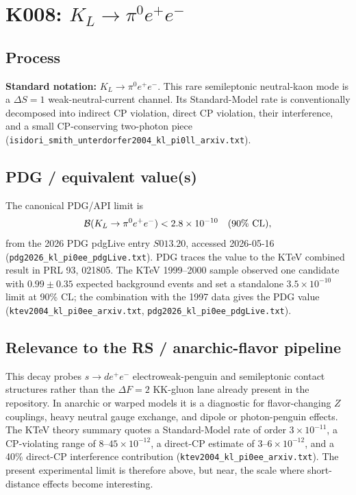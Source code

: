 
\section{\texorpdfstring{K008: \(K_L \to \pi^0 e^+e^-\)}{K008: KL -> pi0 e+e-}}

\subsection*{Process}
\textbf{Standard notation:} \(K_L \to \pi^0 e^+e^-\).  This rare
semileptonic neutral-kaon mode is a \(\Delta S=1\) weak-neutral-current
channel.  Its Standard-Model rate is conventionally decomposed into indirect
CP violation, direct CP violation, their interference, and a small
CP-conserving two-photon piece
(\texttt{isidori\_smith\_unterdorfer2004\_kl\_pi0ll\_arxiv.txt}).

\subsection*{PDG / equivalent value(s)}
The canonical PDG/API limit is
\[
  {\cal B}(K_L \to \pi^0 e^+e^-) < 2.8\times 10^{-10}\quad(90\%\ {\rm CL}),
\]
from the 2026 PDG pdgLive entry \(S013.20\), accessed 2026-05-16
(\texttt{pdg2026\_kl\_pi0ee\_pdgLive.txt}).  PDG traces the value to the KTeV
combined result in PRL 93, 021805.  The KTeV 1999--2000 sample observed one
candidate with \(0.99\pm0.35\) expected background events and set a standalone
\(3.5\times10^{-10}\) limit at 90\% CL; the combination with the 1997 data
gives the PDG value
(\texttt{ktev2004\_kl\_pi0ee\_arxiv.txt},
\texttt{pdg2026\_kl\_pi0ee\_pdgLive.txt}).

\subsection*{Relevance to the RS / anarchic-flavor pipeline}
This decay probes \(s\to d e^+e^-\) electroweak-penguin and semileptonic
contact structures rather than the \(\Delta F=2\) KK-gluon lane already present
in the repository.  In anarchic or warped models it is a diagnostic for
flavor-changing \(Z\) couplings, heavy neutral gauge exchange, and dipole or
photon-penguin effects.  The KTeV theory summary quotes a Standard-Model rate
of order \(3\times10^{-11}\), a CP-violating range of
\(8\)--\(45\times10^{-12}\), a direct-CP estimate of
\(3\)--\(6\times10^{-12}\), and a 40\% direct-CP interference contribution
(\texttt{ktev2004\_kl\_pi0ee\_arxiv.txt}).  The present experimental limit is
therefore above, but near, the scale where short-distance effects become
interesting.

